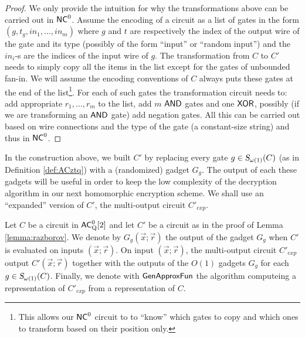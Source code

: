 \begin{proof}
We only provide the intuition for why the transformations above can be carried out in ${\mathsf{NC}}^0$. Assume the encoding of a circuit as a list of gates in the form $(g, t_g, in_1, \dots, in_m)$ where $g$ and $t$ are respectively the index of the output wire of the gate and its type (possibly of the form ``input'' or ``random input'') and the $in_i$-s are the indices of the input wire of $g$. The transformation from $C$ to $C'$ needs to simply copy all the items in the list except for the gates of unbounded fan-in. We will assume the encoding conventions of $C$ always puts these gates at the end of the list\footnote{This allows our ${\mathsf{NC}}^0$ circuit to to ``know'' which gates to copy and which ones to transform based on their position only.}. For each of such gates the transformation circuit needs to: add appropriate $r_1,\dots, r_m$ to the list, add $m$ $\mathsf{AND}$ gates and one $\mathsf{XOR}$, possibly (if we are transforming an $\mathsf{AND}$ gate) add negation gates. All this can be carried out based on wire connections and the type of the gate (a constant-size string) and thus in ${\mathsf{NC}}^0$.
\end{proof}

In the construction above, we built $C'$ by replacing every gate $g \in {\ensuremath{\textsl{S}}}_{\omega(1)}(C)$ (as in Definition \ref{def:ACztq}) with a (randomized) gadget $G_g$. The output of each these gadgets will be useful in order to keep the low complexity of the decryption algorithm in our next homomorphic encryption scheme. We shall use an ``expanded'' version of $C'$, the multi-output circuit $C'_{exp}$. 

\def\GenApproxFun{\function{GenApproxFun}}
\def\SampleAuxRandomness{\function{SampleAuxRandomness}}
\def\EvalApprox{\function{EvalApprox}}

\begin{definition}
\label{def:exp-approx-fun}
Let $C$ be a circuit in ${\mathsf{AC}}^0_{\text{Q}}[2]$ and let $C'$ be a circuit as in the proof of Lemma \ref{lemma:razborov}.
We denote by $G_g(\vec{x}; \vec{r})$  the output of the gadget $G_g$ when $C'$ is evaluated on inputs $(\vec{x}; \vec{r})$. On input $(\vec{x}; \vec{r})$, the multi-output circuit $C'_{exp}$  output $C'(\vec{x};\vec{r})$ together with the outputs of the $O(1)$ gadgets $G_g$ for each $g \in {\ensuremath{\textsl{S}}}_{\omega(1)}(C)$. Finally, we denote with $\GenApproxFun$ the algorithm computeing a representation of $C'_{exp}$ from a representation  of $C$.
\end{definition}

